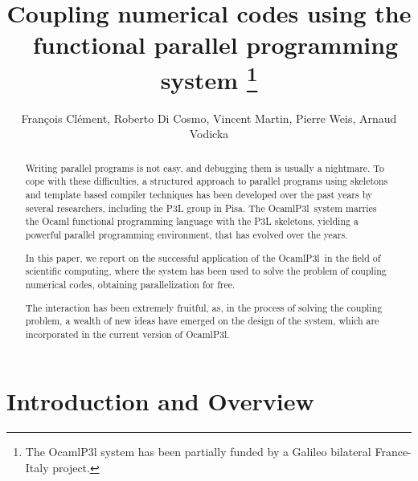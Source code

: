 \documentclass{article}
\title{Coupling numerical codes using the \ocamlpiiil\ functional parallel programming system
       \thanks{The OcamlP3l system has been partially funded by a Galileo bilateral France-Italy project. }}
\author{Fran\c{c}ois Cl\'ement, Roberto Di Cosmo, Vincent Martin, Pierre Weis, Arnaud Vodicka}
\newcommand{\ocamlpiiil}{{\sf OcamlP3l}}
\begin{document}
\maketitle

\begin{abstract}
  Writing parallel programs is not easy, and debugging them is usually
  a nightmare.  To cope with these difficulties, a structured approach
  to parallel programs using skeletons and template based compiler
  techniques has been developed over the past years by several
  researchers, including the P3L group in Pisa. The \ocamlpiiil\ 
  system marries the Ocaml functional programming language with the
  P3L skeletons, yielding a powerful parallel programming environment,
  that has evolved over the years.

  In this paper, we report on the successful application of the \ocamlpiiil\
  in the field of scientific computing, where the system has been used to 
  solve the problem of coupling numerical codes, obtaining parallelization
  for free.

  The interaction has been extremely fruitful, as, in the process of solving the
  coupling problem, a wealth of new ideas have emerged on the design of the
  system, which are incorporated in the current version of  \ocamlpiiil.

\end{abstract}

\section{Introduction and Overview}



%
%


%
%




\end{document}
